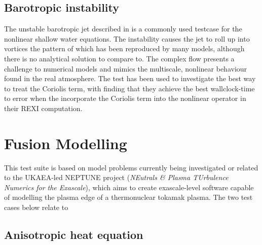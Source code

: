 \documentclass{article}
\begin{document}
\subsection{Barotropic instability}
The unstable barotropic jet described in \citet{galewsky2004initial}
is a commonly used testcase for the nonlinear shallow water
equations. The instability causes the jet to roll up into vortices the
pattern of which has been reproduced by many models, although there is
no analytical solution to compare to. The complex flow presents a
challenge to numerical models and mimics the multiscale, nonlinear
behaviour found in the real atmosphere. The test has been used to
investigate the best way to treat the Coriolis term, with
\citet{schreiber2019exponential} finding that they achieve the best
wallclock-time to error when the incorporate the Coriolis term into
the nonlinear operator in their REXI computation.

\section*{Fusion Modelling}

This test suite is based on model problems currently being investigated or
related to the UKAEA-led NEPTUNE project (\emph{NEutrals \& Plasma TUrbulence
  Numerics for the Exascale}), which aims to create exascale-level software
capable of modelling the plasma edge of a thermonuclear tokamak plasma. The two
test cases below relate to

\subsection{Anisotropic heat equation}
\end{document}
